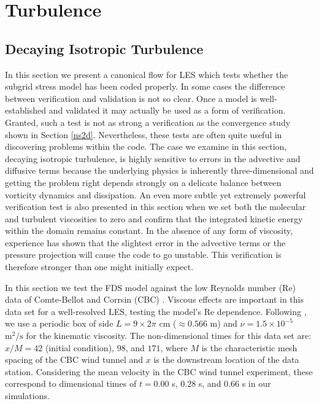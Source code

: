 \documentclass[11pt]{book}
\begin{document}
\chapter{Turbulence}


\section{Decaying Isotropic Turbulence}
\label{decaying_isotropic_turbulence}

In this section we present a canonical flow for LES which tests whether the subgrid stress model has been coded properly. In some cases the difference between verification and validation is not so clear.  Once a model is well-established and validated it may actually be used as a form of verification.  Granted, such a test is not as strong a verification as the convergence study shown in Section \ref{ns2d}.  Nevertheless, these tests are often quite useful in discovering problems within the code.  The case we examine in this section, decaying isotropic turbulence, is highly sensitive to errors in the advective and diffusive terms because the underlying physics is inherently three-dimensional and getting the problem right depends strongly on a delicate balance between vorticity dynamics and dissipation.  An even more subtle yet extremely powerful verification test is also presented in this section when we set both the molecular and turbulent viscosities to zero and confirm that the integrated kinetic energy within the domain remains constant.   In the absence of any form of viscosity, experience has shown that the slightest error in the advective terms or the pressure projection will cause the code to go unstable.  This verification is therefore stronger than one might initially expect.

In this section we test the FDS model against the low Reynolds number (Re) data of Comte-Bellot and Corrsin (CBC) \cite{CBC}. Viscous effects are important in this data set for a well-resolved LES, testing the model's Re dependence.  Following \cite{SdBK}, we use a periodic box of side $L = 9 \times 2\pi$ cm ($\approx 0.566$ m) and $\nu = 1.5 \times 10^{-5}$ $\mbox{m}^2/\mbox{s}$ for the kinematic viscosity. The non-dimensional times for this data set are: $x/M = 42$ (initial condition), $98$, and $171$, where $M$ is the characteristic mesh spacing of the CBC wind tunnel and $x$ is the downstream location of the data station. Considering the mean velocity in the CBC wind tunnel experiment, these correspond to dimensional times of $t = 0.00$ s, $0.28$ s, and $0.66$ s in our simulations.
\end{document}
